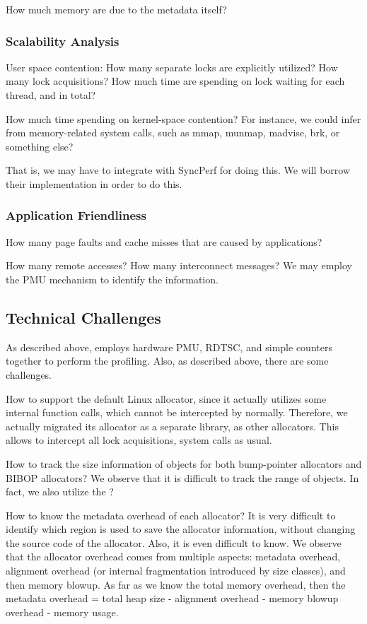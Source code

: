 How much memory are due to the metadata itself? 

\subsubsection{Scalability Analysis} 

User space contention:
How many separate locks are explicitly utilized? 
How many lock acquisitions? How much time are spending on lock waiting for each thread, and in total?

How much time spending on kernel-space contention? For instance, we could infer from memory-related system calls, such as mmap, munmap, madvise, brk, or something else? 

That is, we may have to integrate with SyncPerf for doing this. We will borrow their implementation in order to do this. 

\subsubsection{Application Friendliness} 
How many page faults and cache misses that are caused by applications? 

How many remote accesses? How many interconnect messages? We may employ the PMU mechanism to identify the information.

\subsection{Technical Challenges}

As described above, \MP{} employs hardware PMU, RDTSC, and simple counters together to perform the profiling. Also, as described above, there are some challenges. 
 

How to support the default Linux allocator, since it actually utilizes some internal function calls, which cannot be intercepted by \MP{} normally. Therefore, we actually migrated its allocator as a separate library, as other allocators. This allows \MP{} to intercept all lock acquisitions, system calls as usual. 

How to track the size information of objects for both bump-pointer allocators and BIBOP allocators? We observe that it is difficult to track the range of objects. In fact, we also utilize the ?

How to know the metadata overhead of each allocator? It is very difficult to identify which region is used to save the allocator information, without changing the source code of the allocator. Also, it is even difficult to know. We observe that the allocator overhead comes from multiple aspects: metadata overhead, alignment overhead (or internal fragmentation introduced by size classes), and then memory blowup. 
As far as we know the total memory overhead, then the metadata overhead = total heap size - alignment overhead - memory blowup overhead - memory usage.

